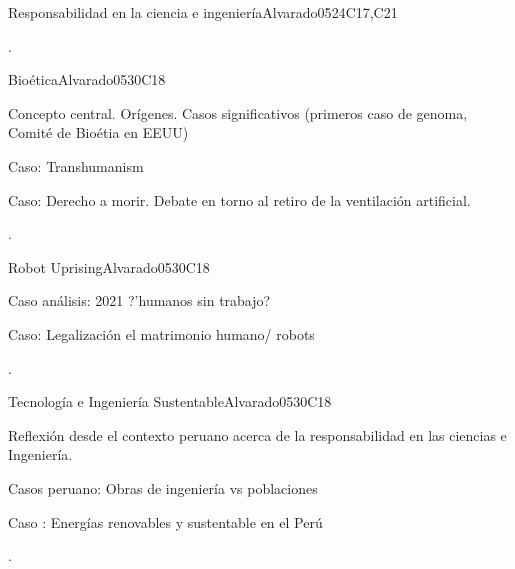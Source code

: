 \begin{syllabus}
\begin{unit}{Responsabilidad en la ciencia e ingeniería}{}{Alvarado05}{24}{C17,C21}
   \begin{learningoutcomes}
      \item .  
   \end{learningoutcomes}
\end{unit}

\begin{unit}{Bioética}{}{Alvarado05}{30}{C18}
   \begin{topics}
      \item  Concepto central. Orígenes. Casos significativos (primeros caso de genoma, Comité de Bioétia en EEUU)
      \item  Caso: Transhumanism
      \item  Caso: Derecho a morir. Debate en torno al retiro de la ventilación artificial.
   \end{topics} 
   \begin{learningoutcomes}
      \item . 
   \end{learningoutcomes}
\end{unit}

\begin{unit}{Robot Uprising}{}{Alvarado05}{30}{C18}
   \begin{topics}
      \item  Caso análisis: 2021 ?'humanos sin trabajo? 
      \item  Caso: Legalización el matrimonio humano/ robots 
   \end{topics}

   \begin{learningoutcomes}
      \item .
   \end{learningoutcomes}
\end{unit}

\begin{unit}{Tecnología e Ingeniería Sustentable}{}{Alvarado05}{30}{C18}
   \begin{topics}
      \item Reflexión desde el contexto peruano acerca de la responsabilidad en las ciencias e Ingeniería. 
      \item Casos peruano: Obras de ingeniería vs poblaciones
      \item Caso : Energías renovables y sustentable en el Perú 
   \end{topics}
   \begin{learningoutcomes}
      \item . 
   \end{learningoutcomes}
\end{unit}


\end{syllabus}
